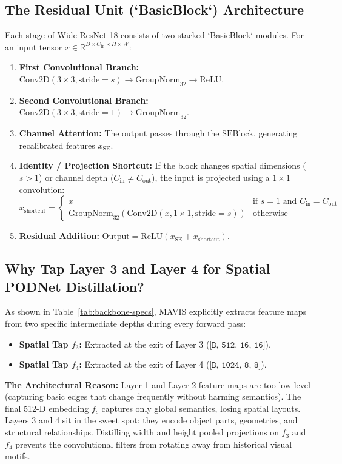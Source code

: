 \documentclass[11pt,a4paper]{article}
\newcommand{\dimtensor}[1]{\texttt{[#1]}}
\begin{document}
\subsection{The Residual Unit (`BasicBlock`) Architecture}
Each stage of Wide ResNet-18 consists of two stacked `BasicBlock` modules. For an input tensor $x \in \mathbb{R}^{B \times C_{\text{in}} \times H \times W}$:
\begin{enumerate}
    \item \textbf{First Convolutional Branch:} $\text{Conv2D}(3 \times 3, \text{stride}=s) \to \text{GroupNorm}_{32} \to \text{ReLU}$.
    \item \textbf{Second Convolutional Branch:} $\text{Conv2D}(3 \times 3, \text{stride}=1) \to \text{GroupNorm}_{32}$.
    \item \textbf{Channel Attention:} The output passes through the $\text{SEBlock}$, generating recalibrated features $x_{\text{SE}}$.
    \item \textbf{Identity / Projection Shortcut:} If the block changes spatial dimensions ($s > 1$) or channel depth ($C_{\text{in}} \neq C_{\text{out}}$), the input is projected using a $1 \times 1$ convolution:
    \begin{equation}
    x_{\text{shortcut}} = \begin{cases} x & \text{if } s = 1 \text{ and } C_{\text{in}} = C_{\text{out}} \\ \text{GroupNorm}_{32}(\text{Conv2D}(x, 1 \times 1, \text{stride}=s)) & \text{otherwise} \end{cases}
    \end{equation}
    \item \textbf{Residual Addition:} $\text{Output} = \text{ReLU}(x_{\text{SE}} + x_{\text{shortcut}})$.
\end{enumerate}

\subsection{Why Tap Layer 3 and Layer 4 for Spatial PODNet Distillation?}
As shown in Table~\ref{tab:backbone-specs}, MAVIS explicitly extracts feature maps from two specific intermediate depths during every forward pass:
\begin{itemize}[noitemsep]
    \item \textbf{Spatial Tap $f_3$:} Extracted at the exit of Layer 3 ($\dimtensor{B, 512, 16, 16}$).
    \item \textbf{Spatial Tap $f_4$:} Extracted at the exit of Layer 4 ($\dimtensor{B, 1024, 8, 8}$).
\end{itemize}
\textbf{The Architectural Reason:} Layer 1 and Layer 2 feature maps are too low-level (capturing basic edges that change frequently without harming semantics). The final 512-D embedding $f_c$ captures only global semantics, losing spatial layouts. Layers 3 and 4 sit in the sweet spot: they encode object parts, geometries, and structural relationships. Distilling width and height pooled projections on $f_3$ and $f_4$ prevents the convolutional filters from rotating away from historical visual motifs.
\end{document}

